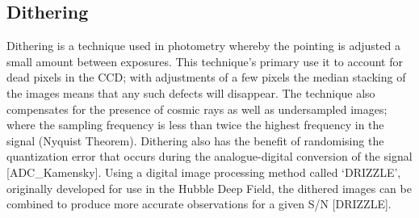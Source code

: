 
\subsection{Dithering} %
\label{sub:dithering}
	Dithering is a technique used in photometry whereby the pointing is adjusted a small amount between exposures. This technique's primary use it to account for dead pixels in the CCD; with adjustments of a few pixels the median stacking of the images means that any such defects will disappear. The technique also compensates for the presence of cosmic rays as well as undersampled images; where the sampling frequency is less than twice the highest frequency in the signal (Nyquist Theorem). Dithering also has the benefit of randomising the quantization error that occurs during the analogue-digital conversion of the signal [ADC_Kamensky]. Using a digital image processing method called ‘DRIZZLE', originally developed for use in the Hubble Deep Field, the dithered images can be combined to produce more accurate observations for a given S/N [DRIZZLE].
